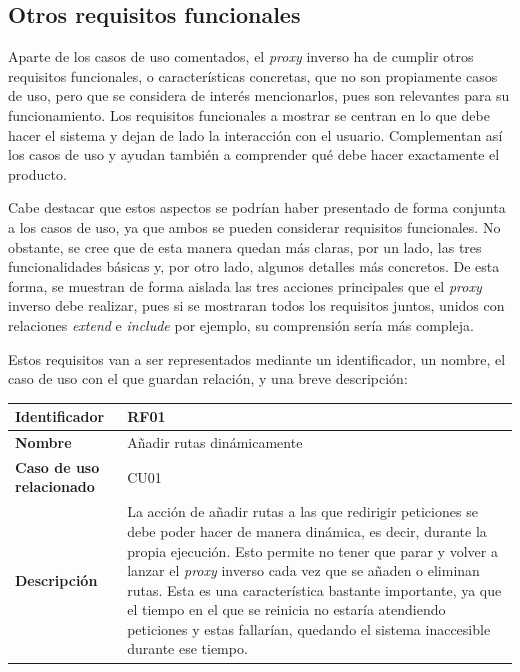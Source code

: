 \documentclass[11pt,spanish,listoffigures]{tfgetsinf}
\begin{document}

		\subsection{Otros requisitos funcionales} \label{requisitosFuncionales}

Aparte de los casos de uso comentados, el \emph{proxy} inverso ha de cumplir otros requisitos funcionales, o características concretas, que no son propiamente casos de uso, pero que se considera de interés mencionarlos, pues son relevantes para su funcionamiento. Los requisitos funcionales a mostrar se centran en lo que debe hacer el sistema y dejan de lado la interacción con el usuario. Complementan así los casos de uso y ayudan también a comprender qué debe hacer exactamente el producto.

Cabe destacar que estos aspectos se podrían haber presentado de forma conjunta a los casos de uso, ya que ambos se pueden considerar requisitos funcionales. No obstante, se cree que de esta manera quedan más claras, por un lado, las tres funcionalidades básicas y, por otro lado, algunos detalles más concretos. De esta forma, se  muestran de forma aislada las tres acciones principales que el \emph{proxy} inverso debe realizar, pues si se mostraran todos los requisitos juntos, unidos con relaciones \emph{extend} e \emph{include} por ejemplo, su comprensión sería más compleja.

Estos requisitos van a ser representados mediante un identificador, un nombre, el caso de uso con el que guardan relación, y una breve descripción:

\begin{center} \begin{tabular}{| l | p{9.5cm} |}
\hline
\textbf{Identificador} & RF01
\\ \hline
\textbf{Nombre} & Añadir rutas dinámicamente
\\ \hline
\textbf{Caso de uso relacionado} & CU01
\\ \hline
\textbf{Descripción} & La acción de añadir rutas a las que redirigir peticiones se debe poder hacer de manera dinámica, es decir, durante la propia ejecución. Esto permite no tener que parar y volver a lanzar el \emph{proxy} inverso cada vez que se añaden o eliminan rutas. Esta es una característica bastante importante, ya que el tiempo en el que se reinicia no estaría atendiendo peticiones y estas fallarían, quedando el sistema inaccesible durante ese tiempo.
\\ \hline \end{tabular} \end{center}
\end{document}
